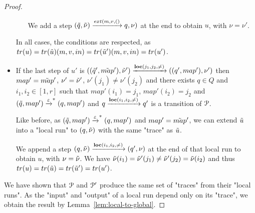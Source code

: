 \begin{proof}
\begin{itemize}
\begin{itemize}
			We add a step $(\Tilde{q}, \Tilde{\nu}) \extbr{m,v} (q, \nu)$ at the end to obtain $u$, with $\nu = \nu'$.
		\end{itemize}
		
		In all cases, the conditions are respected, as $\trace{u} = \trace{\Tilde{u}} (m,v, in) = \trace{\Tilde{u}'} (m,v, in) = \trace{u'}$.
		
		\item If the last step of $u'$ is $((\Tilde{q}', \Tilde{map}'), \Tilde{\nu}') \xrightarrow{\textbf{loc}(j_1,j_2,{\ne})} ((q', map'), \nu')$ then $map'=\Tilde{map}'$, $\nu' = \Tilde{\nu}'$, $\nu'(j_1) \neq \nu'(j_2)$ and there exists $q \in Q$ and $i_1, i_2 \in [1,r]$ such that $map'(i_1)=j_1$, $map'(i_2)=j_2$ and $(\Tilde{q}, map') \xrightarrow{\varepsilon}^* (q, map')$ and $q \xrightarrow{\textbf{loc}(i_1,i_2,{\ne})} q'$ is a transition of $\mathcal{P}$.
		
		Like before, as $(\Tilde{q}, map') \xrightarrow{\varepsilon}^* (q, map')$ and $map'=\Tilde{map}'$, we can extend $\Tilde{u}$ into a "local run" to $(q, \Tilde{\nu})$ with the same "trace" as $\Tilde{u}$.
		
		
		We append a step $(q, \Tilde{\nu}) \xrightarrow{\textbf{loc}(i_1,i_2,{\ne})} (q', \nu)$ at the end of that local run to obtain $u$, with $\nu = \Tilde{\nu}$. We have $\Tilde{\nu}(i_1) = \Tilde{\nu}'(j_1) \neq \Tilde{\nu}'(j_2) = \Tilde{\nu}(i_2)$ and thus $\trace{u} = \trace{\Tilde{u}} = \trace{\Tilde{u}'} = \trace{u'}$.
	\end{itemize}
	
	We have shown that $\mathcal{P}$ and $\mathcal{P}'$ produce the same set of "traces" from their "local runs". As the "input" and "output" of a local run depend only on its "trace", we obtain the result by Lemma~\ref{lem:local-to-global}.
\end{proof}
\fi

